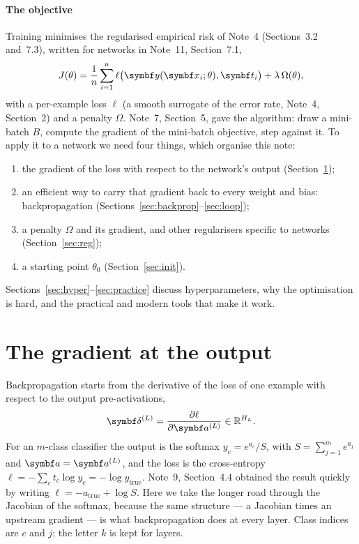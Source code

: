 \documentclass[11pt]{article}
\newcommand{\av}{\vect{a}}
\newcommand{\yv}{\vect{y}}
\newcommand{\tvec}{\vect{t}}
\newcommand{\dv}{\vect{\delta}}
\begin{document}
\paragraph{The objective} Training minimises the regularised empirical risk of Note~4 (Sections~3.2 and~7.3), written
for networks in Note~11, Section~7.1,
\begin{equation}\label{eq:objective}
  J(\theta) = \frac1n\sum_{i=1}^n \ell\big(\yv(\x_i; \theta), \tvec_i\big) + \lambda\,\Omega(\theta) ,
\end{equation}
with a per-example loss $\ell$ (a smooth surrogate of the error rate, Note~4, Section~2) and a penalty $\Omega$. Note~7,
Section~5, gave the algorithm: draw a mini-batch $B$, compute the gradient of the mini-batch objective, step against
it. To apply it to a network we need four things, which organise this note:
\begin{enumerate}
\item the gradient of the loss with respect to the network's output (Section~\ref{sec:output});
\item an efficient way to carry that gradient back to every weight and bias: backpropagation
(Sections~\ref{sec:backprop}--\ref{sec:loop});
\item a penalty $\Omega$ and its gradient, and other regularisers specific to networks (Section~\ref{sec:reg});
\item a starting point $\theta_0$ (Section~\ref{sec:init}).
\end{enumerate}
Sections~\ref{sec:hyper}--\ref{sec:practice} discuss hyperparameters, why the optimisation is hard, and the practical
and modern tools that make it work.

\section{The gradient at the output}\label{sec:output}

Backpropagation starts from the derivative of the loss of one example with respect to the output pre-activations,
\[
  \dv^{(L)} = \frac{\partial \ell}{\partial \av^{(L)}} \in \R^{H_L} .
\]
For an $m$-class classifier the output is the softmax $y_c = e^{a_c}/S$, with $S = \sum_{j=1}^m e^{a_j}$ and
$\av = \av^{(L)}$, and the loss is the cross-entropy $\ell = -\sum_c t_c\log y_c = -\log y_{\text{true}}$. Note~9,
Section~4.4 obtained the result quickly by writing $\ell = -a_{\text{true}} + \log S$. Here we take the longer road
through the Jacobian of the softmax, because the same structure --- a Jacobian times an upstream gradient --- is what
backpropagation does at every layer. Class indices are $c$ and $j$; the letter $k$ is kept for layers.
\end{document}
